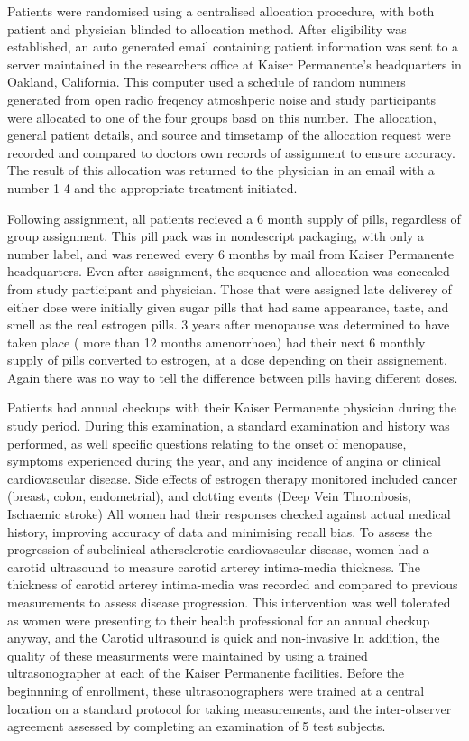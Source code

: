 \documentclass[11pt]{article}
\begin{document}
		Patients were randomised using a centralised allocation procedure, with both patient and physician blinded to allocation method. 
		After eligibility was established, an auto generated email containing patient information was sent to a server maintained in the researchers office at Kaiser Permanente's headquarters in Oakland, California. 
		This computer used a schedule of random numners generated from open radio freqency atmoshperic noise \cite{Eddelbuettel2009}  and study participants were allocated to one of the four groups basd on this number.
		The allocation, general patient details, and source and timsetamp of the allocation request were recorded and compared to doctors own records of assignment to ensure accuracy.
		The result of this allocation was returned to the physician in an email with a number 1-4 and the appropriate treatment initiated.


		Following assignment, all patients recieved a 6 month supply of pills, regardless of group assignment.
		This pill pack was in nondescript packaging, with only a number label, and was renewed every 6 months by mail from Kaiser Permanente headquarters.
		Even after assignment, the sequence and allocation was concealed from study participant and physician.
		Those that were assigned late deliverey of either dose were initially given sugar pills that had same appearance, taste, and smell as the real estrogen pills. 
		3 years after menopause was determined to have taken place ( more than 12 months amenorrhoea) had their next 6 monthly supply of pills converted to estrogen, at a dose depending on their assignement. Again there was no way to tell the difference between pills having different doses.

		
		Patients had annual checkups with their Kaiser Permanente physician during the study period.
		During this examination, a standard examination and history was performed, as well specific questions relating to the onset of menopause, symptoms experienced during the year, and any incidence of angina or clinical cardiovascular disease.
		Side effects of estrogen therapy monitored included cancer (breast, colon, endometrial), and clotting events (Deep Vein Thrombosis, Ischaemic stroke)
		All women had their responses checked against actual medical history, improving accuracy of data and minimising recall bias.
		To assess the progression of subclinical athersclerotic cardiovascular disease, women had a carotid ultrasound to measure carotid arterey intima-media thickness.
		The thickness of carotid arterey intima-media was recorded and compared to previous measurements to assess disease progression.
		This intervention was well tolerated as women were presenting to their health professional for an annual checkup anyway, and the Carotid ultrasound is quick and non-invasive
		In addition, the quality of these measurments were maintained by using a trained ultrasonographer at each of the Kaiser Permanente facilities.
		Before the beginnning of enrollment, these ultrasonographers were trained at a central location on a standard protocol for taking measurements, and the inter-observer agreement assessed by completing an examination of 5 test subjects.
\end{document}
